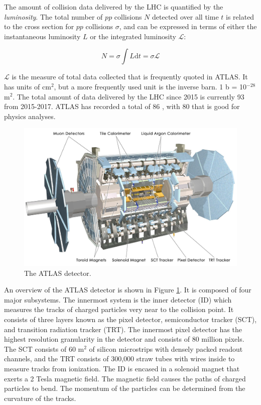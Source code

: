 The amount of \pp collision data delivered by the LHC is quantified by the \textit{luminosity}. The total number of $pp$ collisions $N$ detected over all time $t$ is related to the cross section for $pp$ collisions $\sigma$, and can be expressed in terms of either the instantaneous luminosity $L$ or the integrated luminosity $\mathcal{L}$:

\begin{equation}
N = \sigma \int{L} \text{d}t = \sigma \mathcal{L}
\end{equation}

\noindent $\mathcal{L}$ is the measure of total data collected that is frequently quoted in ATLAS. It has units of cm$^2$, but a more frequently used unit is the inverse barn. 1 b = 10$^{-28}$ m$^2$. The total amount of data delivered by the LHC since 2015 is currently 93 \ifb from 2015-2017. ATLAS has recorded a total of 86 \ifb, with 80 \ifb that is good for physics analyses.

\begin{figure}[htb]
\centering
\includegraphics[width=1\textwidth]{Figures/atlas.jpg}
\caption{The ATLAS detector.}
\label{fig:atlas}
\end{figure}

An overview of the ATLAS detector is shown in Figure \ref{fig:atlas}. It is composed of four major subsystems. The innermost system is the inner detector (ID) which measures the tracks of charged particles very near to the collision point. It consists of three layers known as the pixel detector, semiconductor tracker (SCT), and transition radiation tracker (TRT). The innermost pixel detector has the highest resolution granularity in the detector and consists of 80 million pixels. The SCT consists of 60 m$^2$ of silicon microstrips with densely packed readout channels, and the TRT consists of 300,000 straw tubes with wires inside to measure tracks from ionization. The ID is encased in a solenoid magnet that exerts a 2 Tesla magnetic field. The magnetic field causes the paths of charged particles to bend. The momentum of the particles can be determined from the curvature of the tracks.

